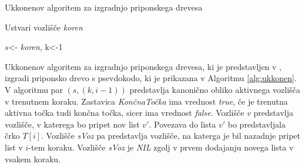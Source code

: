 \begin{algorithm}[tb]

    \caption{Ukkonenov algoritem za izgradnjo priponskega drevesa}\label{alg:ukkonen}
    {
        {Ustvari vozlišče \textit{koren}}
        
        {$s$<- \textit{koren}, k<-1}
        
        
    }
\end{algorithm}

Ukkonenov algoritem za izgradnjo priponskega drevesa, ki je predstavljen v \cite{Ukkonen1995}, izgradi priponsko drevo s psevdokodo, ki je prikazana v Algoritmu \ref{alg:ukkonen}.
V algoritmu par $(s, (k,i-1))$ predstavlja kanonično obliko aktivnega vozlišča v trenutnem koraku. Zastavica \textit{KončnaTočka} ima vrednost \textit{true}, če je trenutna aktivna točka tudi končna točka, sicer ima vrednost \textit{false}. Vozlišče $v$ predstavlja vozlišče, v katerega bo pripet nov list $v'$. Povezava do lista $v'$ bo predstavljala črko $T[i]$. Vozlišče \textit{sVoz} pa predstavlja vozlišče, na katerga je bil nazadnje pripet list v $i$-tem koraku. Vozlišče \textit{sVoz} je \textit{NIL} zgolj v prvem dodajanju novega lista v vsakem koraku.


